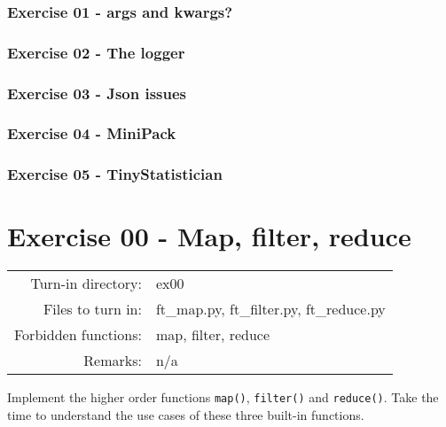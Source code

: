 \documentclass[]{article}
\begin{document}
\hypertarget{exercise-01---args-and-kwargs}{%
\subsubsection{Exercise 01 - args and
kwargs?}\label{exercise-01---args-and-kwargs}}

\hypertarget{exercise-02---the-logger}{%
\subsubsection{Exercise 02 - The
logger}\label{exercise-02---the-logger}}

\hypertarget{exercise-03---json-issues}{%
\subsubsection{Exercise 03 - Json
issues}\label{exercise-03---json-issues}}

\hypertarget{exercise-04---minipack}{%
\subsubsection{Exercise 04 - MiniPack}\label{exercise-04---minipack}}

\hypertarget{exercise-05---tinystatistician}{%
\subsubsection{Exercise 05 -
TinyStatistician}\label{exercise-05---tinystatistician}}

\clearpage

\hypertarget{exercise-00---map-filter-reduce-1}{%
\section{Exercise 00 - Map, filter,
reduce}\label{exercise-00---map-filter-reduce-1}}

\begin{longtable}[]{@{}rl@{}}
\toprule
\endhead
Turn-in directory: & ex00\tabularnewline
Files to turn in: & ft\_map.py, ft\_filter.py,
ft\_reduce.py\tabularnewline
Forbidden functions: & map, filter, reduce\tabularnewline
Remarks: & n/a\tabularnewline
\bottomrule
\end{longtable}

Implement the higher order functions \texttt{map()}, \texttt{filter()}
and \texttt{reduce()}. Take the time to understand the use cases of
these three built-in functions.
\end{document}
